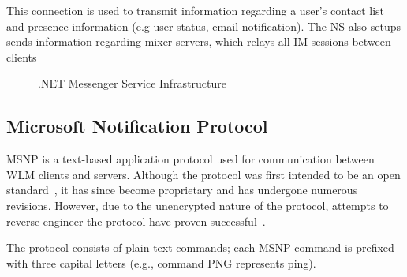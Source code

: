 \documentclass{sig-alternate}
\begin{document}
This connection is used to transmit information regarding a user's contact list and presence information (e.g
user status, email notification).
The NS also setups sends information regarding mixer servers, which relays all IM sessions between clients


\begin{figure}[h]
	\centering
	\caption{.NET Messenger Service Infrastructure}
	\label{fig:wlminfrastructure}
\end{figure}

\subsection{Microsoft Notification Protocol}

MSNP is a text-based application protocol used for communication between WLM clients and servers.
Although the protocol was first intended to be an open standard~\cite{fout:insidewlm}, it has since become proprietary and has undergone numerous revisions.
However, due to the unencrypted nature of the protocol, attempts to reverse-engineer the protocol have proven successful~\cite{hypothetic:msnp, msnfanatic:msnp}.

The protocol consists of plain text commands; each MSNP command is prefixed with three capital letters (e.g., command PNG represents ping).
\end{document}
